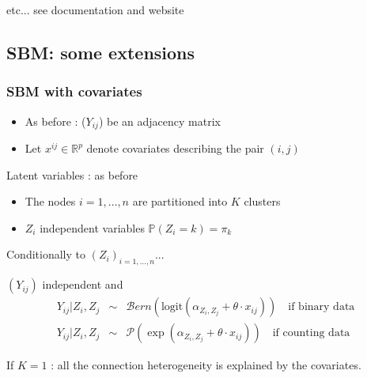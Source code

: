 \documentclass{beamer}\usepackage[]{graphicx}\usepackage[]{color}
\begin{document}
\begin{frame}
etc... see documentation and website

\end{frame}

\subsection{SBM: some extensions}

\begin{frame}
 \frametitle{SBM with covariates}

\begin{itemize}
\item As before :  ($Y_{ij}$) be an adjacency matrix 
\item  Let   $x^{ij} \in \mathbb{R}^p$  denote covariates describing the pair $(i,j)$
\end{itemize}

\begin{block}{Latent variables : as before }
\begin{itemize}
\item The nodes $i= 1,\dots,n$ are partitioned into $K$ clusters
\item $Z_i$ independent variables $ \mathbb{P}(Z_i = k) = \pi_k$
\end{itemize}
\end{block}
 
\begin{block}{Conditionally to $(Z_i)_{i=1,\dots,n}$... }

$(Y_{ij})$ independent and 
\begin{eqnarray*}
 Y_{ij}  | Z_i, Z_j&\sim&   \mathcal{B}ern(\mbox{logit}(\alpha_{Z_i,Z_j} + \theta \cdot x_{ij}) ) \quad \mbox {if binary data} \\
 Y_{ij}  | Z_i, Z_j  &\sim&  \mathcal{P}(\exp(\alpha_{Z_i,Z_j} + \theta  \cdot x_{ij}) ) \quad \mbox {if counting data} 
\end{eqnarray*}
\end{block}


If $K = 1$ : all the connection heterogeneity is explained by the covariates. 
 \end{frame}
\end{document}
